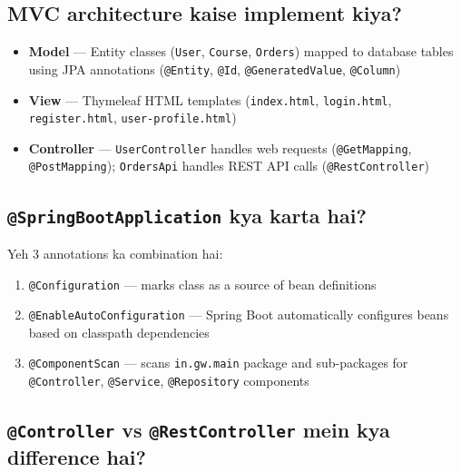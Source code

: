 \documentclass[12pt,a4paper]{article}
\begin{document}
\subsection{MVC architecture kaise implement kiya?}

\begin{answerbox}
\begin{itemize}
    \item \textbf{Model} --- Entity classes (\texttt{User}, \texttt{Course}, \texttt{Orders}) mapped to database tables using JPA annotations (\texttt{@Entity}, \texttt{@Id}, \texttt{@GeneratedValue}, \texttt{@Column})
    \item \textbf{View} --- Thymeleaf HTML templates (\texttt{index.html}, \texttt{login.html}, \texttt{register.html}, \texttt{user-profile.html})
    \item \textbf{Controller} --- \texttt{UserController} handles web requests (\texttt{@GetMapping}, \texttt{@PostMapping}); \texttt{OrdersApi} handles REST API calls (\texttt{@RestController})
\end{itemize}
\end{answerbox}

\subsection{\texttt{@SpringBootApplication} kya karta hai?}

\begin{answerbox}
Yeh 3 annotations ka combination hai:
\begin{enumerate}
    \item \texttt{@Configuration} --- marks class as a source of bean definitions
    \item \texttt{@EnableAutoConfiguration} --- Spring Boot automatically configures beans based on classpath dependencies
    \item \texttt{@ComponentScan} --- scans \texttt{in.gw.main} package and sub-packages for \texttt{@Controller}, \texttt{@Service}, \texttt{@Repository} components
\end{enumerate}
\end{answerbox}

\subsection{\texttt{@Controller} vs \texttt{@RestController} mein kya difference hai?}
\end{document}

